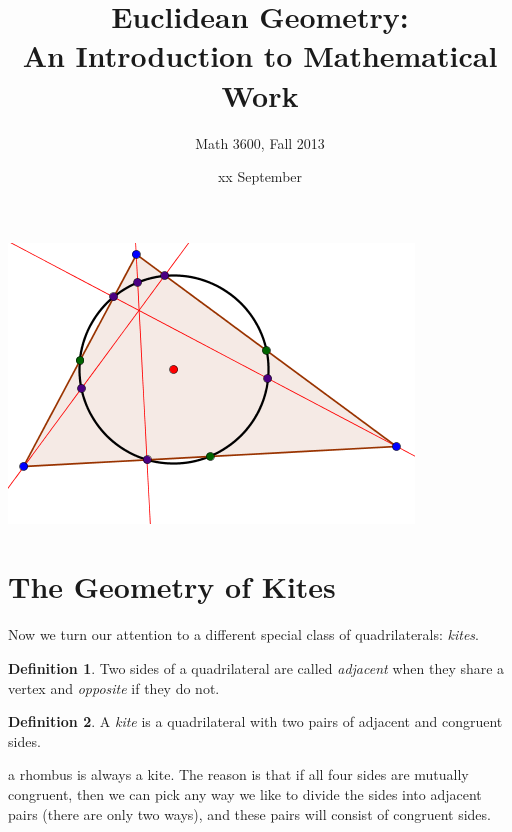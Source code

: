 \documentclass{tufte-handout}
\title{Euclidean Geometry:\\An Introduction to Mathematical Work}
\author[]{Math 3600, Fall 2013}
\date{xx September}
\theoremstyle{definition}
\newtheorem*{definition}{Definition}
\begin{document}
\maketitle

\begin{marginfigure}
    \includegraphics{NPC}
\end{marginfigure}

\setcounter{section}{2}
\section{The Geometry of Kites}

Now we turn our attention to a different special class of quadrilaterals: \emph{kites}. 

\begin{definition}\label{defn:quad-sides-type}
Two sides of a quadrilateral are called \emph{adjacent} when they share a vertex and \emph{opposite} if they do not.
\end{definition}


\begin{definition}\label{defn:kite}
A \emph{kite} is a quadrilateral with two pairs of adjacent and congruent sides.
\end{definition}

 a rhombus is always a kite.
The reason is that if all four sides are mutually congruent, then we can pick any way we like to divide the sides into adjacent pairs (there are only two ways), and these pairs will consist of congruent sides.
\end{document}
